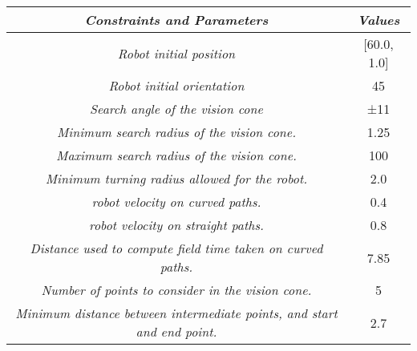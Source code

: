 \begin{table}[]
    \begin{tabular}{|c|c|}
    \hline
    \rowcolor[HTML]{FFCC67} 
    \textit{\textbf{Constraints and Parameters}}                                    & \textit{\textbf{Values}}       \\ \hline
    \rowcolor[HTML]{CBF9FC} 
    \textit{Robot initial position}                                                 & {[}60.0, 1.0{]}                \\ \hline
    \rowcolor[HTML]{CBF9FC} 
    \textit{Robot initial orientation}                                              & 45                             \\ \hline
    \rowcolor[HTML]{CBF9FC} 
    \textit{Search angle of the vision cone}                                        & ±11                            \\ \hline
    \rowcolor[HTML]{CBF9FC} 
    \textit{Minimum search radius of the vision cone.}                              & 1.25                           \\ \hline
    \rowcolor[HTML]{CBF9FC} 
    \textit{Maximum search radius of the vision cone.}                              & 100                            \\ \hline
    \rowcolor[HTML]{CBF9FC} 
    \textit{Minimum turning radius allowed for the robot.}                          & 2.0                            \\ \hline
    \rowcolor[HTML]{CBF9FC} 
    \textit{robot velocity on curved paths.}                                        & 0.4                            \\ \hline
    \rowcolor[HTML]{CBF9FC} 
    \textit{robot velocity on straight paths.}                                      & 0.8                            \\ \hline
    \rowcolor[HTML]{CBF9FC} 
    \textit{Distance used to compute field time taken on curved paths.}             & 7.85                           \\ \hline
    \rowcolor[HTML]{CBF9FC} 
    \textit{Number of points to consider in the vision cone.}                       & 5                              \\ \hline
    \rowcolor[HTML]{CBF9FC} 
    \textit{Minimum distance between intermediate points, and start and end point.} & 2.7                            \\ \hline

\end{tabular}
\end{table}
